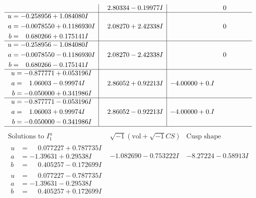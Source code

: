 \documentclass[1p]{elsarticle_modified}
\theoremstyle{definition}
\newcommand{\I}{\sqrt{-1}}
\begin{document}
$$\begin{array}{c|c|c}
 & \phantom{-}2.80334 - 0.19977 I & \phantom{-0.000000 } 0 \\ \hline\begin{aligned}
u &= -0.258956 + 1.084080 I \\
a &= -0.0078550 + 0.1186930 I \\
b &= \phantom{-}0.680266 + 0.175141 I\end{aligned}
 & \phantom{-}2.08270 + 2.42338 I & \phantom{-0.000000 } 0 \\ \hline\begin{aligned}
u &= -0.258956 - 1.084080 I \\
a &= -0.0078550 - 0.1186930 I \\
b &= \phantom{-}0.680266 - 0.175141 I\end{aligned}
 & \phantom{-}2.08270 - 2.42338 I & \phantom{-0.000000 } 0 \\ \hline\begin{aligned}
u &= -0.877771 + 0.053196 I \\
a &= \phantom{-}1.06003 - 0.99974 I \\
b &= -0.050000 + 0.341986 I\end{aligned}
 & \phantom{-}2.86052 + 0.92213 I & -4.00000 + 0. I\phantom{ +0.000000I} \\ \hline\begin{aligned}
u &= -0.877771 - 0.053196 I \\
a &= \phantom{-}1.06003 + 0.99974 I \\
b &= -0.050000 - 0.341986 I\end{aligned}
 & \phantom{-}2.86052 - 0.92213 I & -4.00000 + 0. I\phantom{ +0.000000I}\\
 \hline 
 \end{array}$$\newpage$$\begin{array}{c|c|c}  
\text{Solutions to }I^u_{1}& \I (\text{vol} + \sqrt{-1}CS) & \text{Cusp shape}\\
 \hline 
\begin{aligned}
u &= \phantom{-}0.077227 + 0.787735 I \\
a &= -1.39631 + 0.29538 I \\
b &= \phantom{-}0.405257 - 0.172699 I\end{aligned}
 & -1.082690 - 0.753222 I & -8.27224 - 0.58913 I \\ \hline\begin{aligned}
u &= \phantom{-}0.077227 - 0.787735 I \\
a &= -1.39631 - 0.29538 I \\
b &= \phantom{-}0.405257 + 0.172699 I\end{aligned}

\end{array}$$
\end{document}
